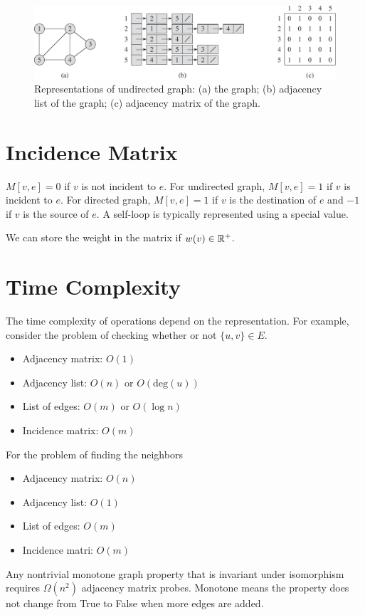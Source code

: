 \begin{figure}[htbp]
    \centering
    \includegraphics[width=\linewidth]{figures/undirected_graph.pdf}
    \caption{Representations of undirected graph: (a) the graph; (b) adjacency list of the graph; (c) adjacency matrix of the graph.}
    \label{fig:graph-rep}
\end{figure}

\section{Incidence Matrix} 

$M[v,e]=0$ if $v$ is not incident to $e$. For undirected graph, $M[v,e]=1$ if $v$ is incident to $e$. For directed graph, $M[v,e]=1$ if $v$ is the destination of $e$ and $-1$ if $v$ is the source of $e$. A self-loop is typically represented using a special value.

We can store the weight in the matrix if $w(v) \in \mathbb{R}^+$. 

\section{Time Complexity}

The time complexity of operations depend on the representation. For example, consider the problem of checking whether or not $\{u,v\} \in E$.

\begin{itemize}
    \item Adjacency matrix: $O(1)$
    \item Adjacency list: $O(n)$ or $O(\mathrm{deg}(u))$
    \item List of edges: $O(m)$ or $O(\log n)$
    \item Incidence matrix: $O(m)$  
\end{itemize}

For the problem of finding the neighbors

\begin{itemize}
    \item Adjacency matrix: $O(n)$ 
    \item Adjacency list: $O(1)$ 
    \item List of edges: $O(m)$ 
    \item Incidence matri: $O(m)$ 
\end{itemize}


\begin{theorem} 
    Any nontrivial monotone graph property that is invariant under isomorphism requires $\Omega(n^2)$ adjacency matrix probes. Monotone means the property does not change from True to False when more edges are added.
\end{theorem}